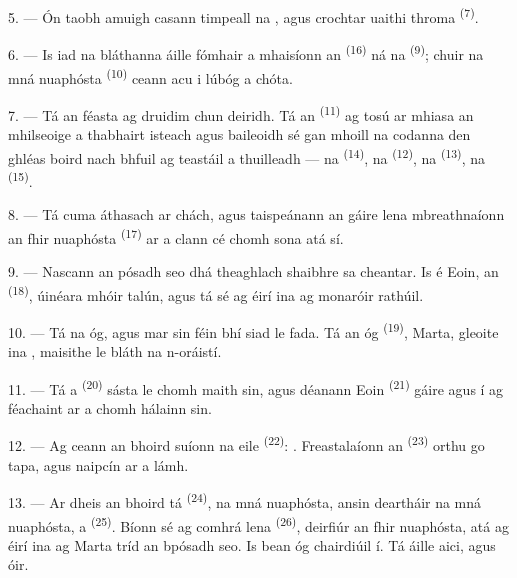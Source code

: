 5. --- Ón taobh amuigh casann  timpeall na
, agus crochtar uaithi  throma
\textsuperscript{(7)}.

6. --- Is iad na bláthanna áille fómhair a mhaisíonn an 
\textsuperscript{(16)} ná na  \textsuperscript{(9)}; chuir
 na mná nuaphósta \textsuperscript{(10)} ceann acu i lúbóg a chóta.

7. --- Tá an féasta ag druidim chun deiridh. Tá an 
\textsuperscript{(11)} ag tosú ar mhiasa an mhilseoige a thabhairt isteach agus
baileoidh sé gan mhoill na codanna den ghléas boird nach bhfuil ag teastáil a
thuilleadh --- na  \textsuperscript{(14)}, na 
\textsuperscript{(12)}, na  \textsuperscript{(13)}, na
 \textsuperscript{(15)}.

\VUsaut{3.0mm}

8. --- Tá cuma áthasach ar chách, agus taispeánann an gáire lena mbreathnaíonn
 an fhir nuaphósta \textsuperscript{(17)} ar a clann cé chomh sona
atá sí.

9. --- Nascann an pósadh seo dhá theaghlach shaibhre sa cheantar. Is é Eoin, an
 \textsuperscript{(18)},  úinéara mhóir talún, agus
tá sé ag éirí ina  ag monaróir rathúil.

10. --- Tá na  óg, agus mar sin féin bhí siad
 le fada. Tá an  óg \textsuperscript{(19)},
Marta, gleoite ina , maisithe le bláth na n-oráistí.

11. --- Tá a  \textsuperscript{(20)} sásta le
 chomh maith sin, agus déanann  Eoin
\textsuperscript{(21)} gáire agus í ag féachaint ar a  chomh
hálainn sin.

12. --- Ag ceann an bhoird suíonn na  eile \textsuperscript{(22)}:
. Freastalaíonn an 
\textsuperscript{(23)} orthu go tapa, agus naipcín ar a lámh.

\VUsaut{3.0mm}

13. --- Ar dheis an bhoird tá  \textsuperscript{(24)},
 na mná nuaphósta, ansin deartháir na mná nuaphósta, a
 \textsuperscript{(25)}. Bíonn sé ag comhrá lena
 \textsuperscript{(26)}, deirfiúr an fhir nuaphósta,
atá ag éirí ina  ag Marta tríd an bpósadh seo. Is bean óg
chairdiúil í. Tá  áille aici,  agus
 óir.

